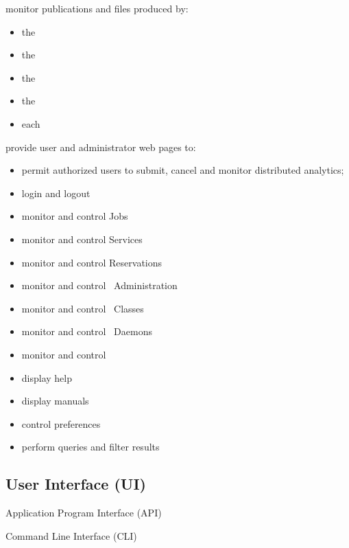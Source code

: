     \begin{description}
      \item monitor publications and files produced by:
      \begin{itemize}
        \item the \varOR
        \item the \varRM
        \item the \varSM
        \item the \varPM
        \item each \varAgent
      \end{itemize}
      \item provide user and administrator web pages to:
      \begin{itemize}
        \item permit authorized users to submit, cancel and monitor distributed analytics;
        \item login and logout
        \item monitor and control Jobs
        \item monitor and control Services
        \item monitor and control Reservations
        \item monitor and control \varDUCC~Administration
        \item monitor and control \varDUCC~Classes
        \item monitor and control \varDUCC~Daemons
        \item monitor and control \varDUCC~\varNodesMachinesComputers
        \item display help
        \item display manuals
        \item control preferences
        \item perform queries and filter results
      \end{itemize}
    \end{description}
    
    \subsection{User Interface (UI)}    
      \begin{description}
        \item Application Program Interface (API)
        \item Command Line Interface (CLI)
      \end{description}      
    
